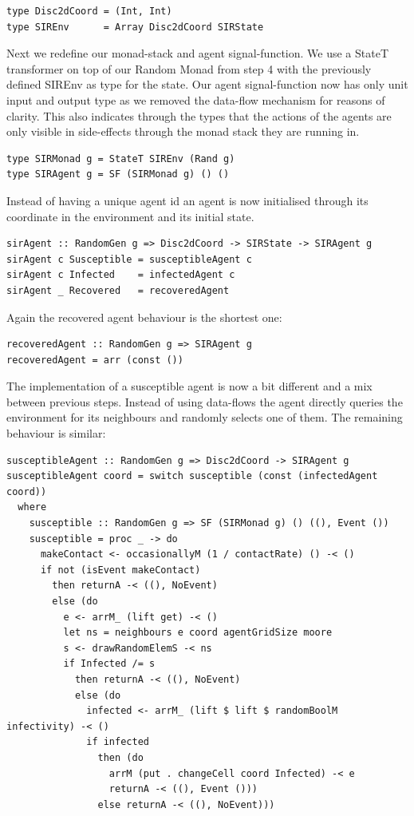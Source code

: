 \begin{verbatim}
type Disc2dCoord = (Int, Int)
type SIREnv      = Array Disc2dCoord SIRState
\end{verbatim}

Next we redefine our monad-stack and agent signal-function. We use a StateT transformer on top of our Random Monad from step 4 with the previously defined SIREnv as type for the state. Our agent signal-function now has only unit input and output type as we removed the data-flow mechanism for reasons of clarity. This also indicates through the types that the actions of the agents are only visible in side-effects through the monad stack they are running in.

\begin{verbatim}
type SIRMonad g = StateT SIREnv (Rand g)
type SIRAgent g = SF (SIRMonad g) () ()
\end{verbatim}

Instead of having a unique agent id an agent is now initialised through its coordinate in the environment and its initial state. 

\begin{verbatim}
sirAgent :: RandomGen g => Disc2dCoord -> SIRState -> SIRAgent g
sirAgent c Susceptible = susceptibleAgent c
sirAgent c Infected    = infectedAgent c
sirAgent _ Recovered   = recoveredAgent
\end{verbatim}

Again the recovered agent behaviour is the shortest one:
\begin{verbatim}
recoveredAgent :: RandomGen g => SIRAgent g
recoveredAgent = arr (const ())
\end{verbatim}

The implementation of a susceptible agent is now a bit different and a mix between previous steps. Instead of using data-flows the agent directly queries the environment for its neighbours and randomly selects one of them. The remaining behaviour is similar:

\begin{verbatim}
susceptibleAgent :: RandomGen g => Disc2dCoord -> SIRAgent g
susceptibleAgent coord = switch susceptible (const (infectedAgent coord))
  where
    susceptible :: RandomGen g => SF (SIRMonad g) () ((), Event ())
    susceptible = proc _ -> do
      makeContact <- occasionallyM (1 / contactRate) () -< ()
      if not (isEvent makeContact)
        then returnA -< ((), NoEvent)
        else (do
          e <- arrM_ (lift get) -< ()
          let ns = neighbours e coord agentGridSize moore
          s <- drawRandomElemS -< ns
          if Infected /= s
            then returnA -< ((), NoEvent)
            else (do
              infected <- arrM_ (lift $ lift $ randomBoolM infectivity) -< ()
              if infected 
                then (do
                  arrM (put . changeCell coord Infected) -< e
                  returnA -< ((), Event ()))
                else returnA -< ((), NoEvent)))
\end{verbatim}

